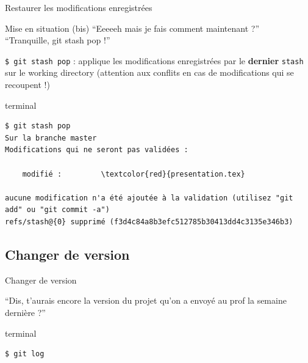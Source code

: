 \documentclass[usepdftitle=false]{beamer}
\begin{document}
\begin{frame}[fragile]{Restaurer les modifications enregistrées}
	\begin{block}{Mise en situation (bis)}
		\enquote{Eeeeeh mais je fais comment maintenant ?} \\
		\enquote{Tranquille, git stash pop !}
	\end{block}

	\verb+$ git stash pop+ : applique les modifications enregistrées par le \textbf{dernier} \verb+stash+ sur le working directory (attention aux conflits en cas de modifications qui se recoupent !)
	\begin{beamercolorbox}[rounded=true,shadow=true]{terminal}
\begin{Verbatim}
$ git stash pop
Sur la branche master
Modifications qui ne seront pas validées :

	modifié :         \textcolor{red}{presentation.tex}

aucune modification n'a été ajoutée à la validation (utilisez "git add" ou "git commit -a")
refs/stash@{0} supprimé (f3d4c84a8b3efc512785b30413dd4c3135e346b3)
\end{Verbatim}
	\end{beamercolorbox}
\end{frame}

\subsection{Changer de version}

\begin{frame}[fragile]{Changer de version}
	\begin{block}{}
		\enquote{Dis, t'aurais encore la version du projet qu'on a envoyé au prof la semaine dernière ?}
	\end{block}

	\begin{beamercolorbox}[rounded=true,shadow=true]{terminal}
\begin{Verbatim}
$ git log
\end{Verbatim}
	\end{beamercolorbox}
\end{frame}
\end{document}
